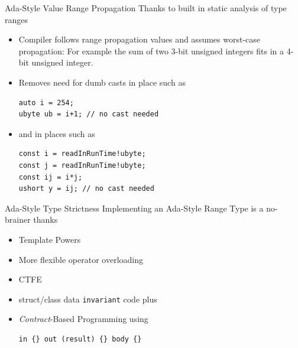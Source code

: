 \documentclass[xcolor=dvipsnames]{beamer}
\begin{document}
\begin{frame}[fragile]{Ada-Style Value Range Propagation}
  Thanks to built in static analysis of type ranges
  \begin{itemize}[<+->]
  \item Compiler follows range propagation values and assumes worst-case
    propagation: For example the sum of two 3-bit unsigned integers fits in a
    4-bit unsigned integer.
  \item Removes need for dumb casts in place such as
    \begin{lstlisting}[frame=single]
auto i = 254;
ubyte ub = i+1; // no cast needed
    \end{lstlisting}
  \item and in places such as
    \begin{lstlisting}[frame=single]
const i = readInRunTime!ubyte;
const j = readInRunTime!ubyte;
const ij = i*j;
ushort y = ij; // no cast needed
    \end{lstlisting}
  \end{itemize}
\end{frame}

\begin{frame}[fragile]{Ada-Style Type Strictness}
  Implementing an Ada-Style Range Type is a no-brainer thanks
  \begin{itemize}[<+->]
  \item Template Powers
  \item More flexible operator overloading
  \item CTFE
  \item struct/class data \texttt{invariant} code {} plus
  \item \emph{Contract}-Based Programming using
    \begin{lstlisting}[frame=single]
in {} out (result) {} body {}
    \end{lstlisting}
  \end{itemize}
\end{frame}
\end{document}
